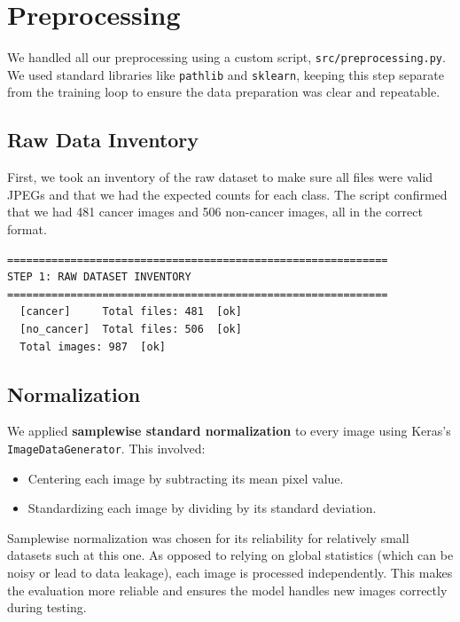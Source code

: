 \section{Preprocessing}
\label{sec:preprocessing}

We handled all our preprocessing using a custom script, \texttt{src/preprocessing.py}. We used standard libraries like \texttt{pathlib} and \texttt{sklearn}, keeping this step separate from the training loop to ensure the data preparation was clear and repeatable.

\subsection{Raw Data Inventory}

First, we took an inventory of the raw dataset to make sure all files were valid JPEGs and that we had the expected counts for each class. The script confirmed that we had 481 cancer images and 506 non-cancer images, all in the correct format.

\begin{lstlisting}[style=python]
============================================================
STEP 1: RAW DATASET INVENTORY
============================================================
  [cancer]     Total files: 481  [ok]
  [no_cancer]  Total files: 506  [ok]
  Total images: 987  [ok]
\end{lstlisting}

\subsection{Normalization}

We applied \textbf{samplewise standard normalization} to every image using Keras's \texttt{ImageDataGenerator}. This involved:
\begin{itemize}
  \item Centering each image by subtracting its mean pixel value.
  \item Standardizing each image by dividing by its standard deviation.
\end{itemize}

Samplewise normalization was chosen for its reliability for relatively small datasets such at this one. As opposed to relying on global statistics (which can be noisy or lead to data leakage), each image is processed independently. This makes the evaluation more reliable and ensures the model handles new images correctly during testing.

